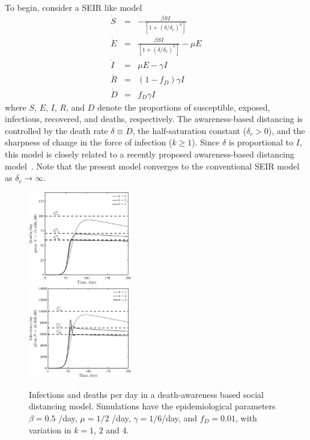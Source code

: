 To begin, consider a SEIR like model
\begin{eqnarray}
\dot{S} &=& -\frac{\beta SI}{\left[1+\left(\delta/\delta_c\right)^{k}\right]}\\
\dot{E} &=& \frac{\beta SI}{\left[1+\left(\delta/\delta_c\right)^{k}\right]}-\mu E\\
\dot{I} &=& \mu E-\gamma I \\
\dot{R} &=& (1-f_D)\gamma I\\
\dot{D} &=& f_D\gamma I
\end{eqnarray}
where $S$, $E$, $I$, $R$, and $D$ denote the proportions of
susceptible, exposed, infectious, recovered, and deaths, respectively.
The awareness-based distancing is controlled by 
the death rate $\delta\equiv \dot{D}$,
the half-saturation constant ($\delta_c>0$), and
the sharpness of change in the force of infection ($k\geq 1$).
Since $\delta$ is proportional to $I$, this model is closely related to a recently proposed awareness-based distancing model~\citep{eksin2019systematic}.
Note that the present
model converges to the conventional SEIR model as $\delta_c\rightarrow \infty$.
\begin{figure}[t!]
\begin{center}
\includegraphics[width=0.4\textwidth]{scripts/figseir_baseplat_k2_D_noname.pdf}\\
\includegraphics[width=0.4\textwidth]{scripts/figseir_baseplat_k2_I_noname.pdf}
\caption{Infections and deaths per day in a death-awareness based
social distancing model.  Simulations have the
epidemiological parameters 
$\beta=0.5$ /day, $\mu=1/2$ /day, $\gamma=1/6$/day,
and $f_D=0.01$, with variation in $k=1$, 2 and 4. 
\label{fig.ID_day}}
\end{center}
\end{figure}

